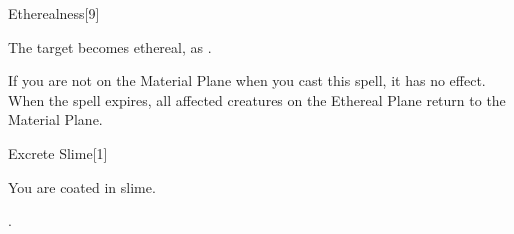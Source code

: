 \begin{spellsection}{Etherealness}[9]
    \begin{spellheader}
    \end{spellheader}
    \begin{spellcontent}
        \begin{spelltargetinginfo}
        \end{spelltargetinginfo}
        \begin{spelleffects}
            \spelleffect The target becomes ethereal, as .
        \end{spelleffects}
    \end{spellcontent}
    \begin{spellfooter}
        \spellnotes If you are not on the Material Plane when you cast this spell, it has no effect. When the spell expires, all affected creatures on the Ethereal Plane return to the Material Plane.
        \miscastexplode
    \end{spellfooter}
\end{spellsection}

\begin{spellsection}{Excrete Slime}[1]
    \begin{spellheader}
    \end{spellheader}
    \begin{spellcontent}
        \begin{spelltargetinginfo}
        \end{spelltargetinginfo}
        \begin{spelleffects}
            \spelleffect You are coated in slime.
            \spelldur \durshort
        \end{spelleffects}
    \end{spellcontent}
    \begin{spellsubcontent}
        \begin{spelltargetinginfo}
        \end{spelltargetinginfo}
        \begin{spelleffects}
            \spelleffect {}.
        \end{spelleffects}
    \end{spellsubcontent}
    \begin{spellfooter}
        \miscastexplode
    \end{spellfooter}
\end{spellsection}

